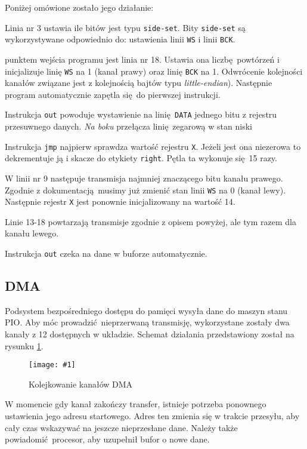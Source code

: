 \documentclass[polish]{aghengthesis}
\let\tempone\itemize
\let\temptwo\enditemize
\renewenvironment{itemize}{\tempone\setlength{\itemsep}{0cm}}{\temptwo}
\newcommand{\imgint}[4]{
	\begin{figure}[{#4}]
		\centering
		\texttt{[image: \#1]}
		\caption{#2}
		\label{#1}
	\end{figure}
}
\newcommand{\imgh}[3]{\imgint{#1}{#2}{#3}{H}}
\begin{document}
			Poniżej omówione zostało jego działanie:
			\begin{itemize}
				\item Linia nr 3 ustawia ile bitów jest typu \lstinline|side-set|. Bity \lstinline|side-set| są wykorzystywane odpowiednio do: ustawienia linii \lstinline|WS| i linii \lstinline|BCK|.
				
				\item punktem wejścia programu jest linia nr 18. Ustawia ona liczbę powtórzeń i inicjalizuje linię \lstinline|WS| na 1 (kanał prawy) oraz linię \lstinline|BCK| na 1. Odwrócenie kolejności kanałów związane jest z kolejnością bajtów typu \textit{little-endian}). Następnie program automatycznie zapętla się do pierwszej instrukcji.
				
				\item Instrukcja \lstinline|out| powoduje wystawienie na linię \lstinline|DATA| jednego bitu z rejestru przesuwnego danych. \textit{Na boku} przełącza linię zegarową w stan niski
				
				\item Instrukcja \lstinline|jmp| najpierw sprawdza wartość rejestru \lstinline|X|. Jeżeli jest ona niezerowa to dekrementuje ją i skacze do etykiety \lstinline|right|. Pętla ta wykonuje się 15 razy.
				
				\item W linii nr 9 następuje transmisja najmniej znaczącego bitu kanału prawego. Zgodnie z dokumentacją musimy już zmienić stan linii \lstinline|WS| na 0 (kanał lewy). Następnie rejestr \lstinline|X| jest ponownie inicjalizowany na wartość 14.
				
				\item Linie 13-18 powtarzają transmisje zgodnie z opisem powyżej, ale tym razem dla kanału lewego.
			\end{itemize}
			
			Instrukcja \lstinline|out| czeka na dane w buforze automatycznie.
		
		\subsection{DMA}
			Podsystem bezpośredniego dostępu do pamięci wysyła dane do maszyn stanu PIO. Aby móc prowadzić nieprzerwaną transmisję, wykorzystane zostały dwa kanały z 12 dostępnych w układzie. Schemat działania przedstawiony został na rysunku \ref{3/dma_chain}.
			\imgh{3/dma_chain}{Kolejkowanie kanałów DMA}{0.55}
			
			W momencie gdy kanał zakończy transfer, istnieje potrzeba ponownego ustawienia jego adresu startowego.
			Adres ten zmienia się w trakcie przesyłu, aby cały czas wskazywać na jeszcze nieprzesłane dane.
			Należy także powiadomić procesor, aby uzupełnił bufor o nowe dane.
			$ $\\
			
\end{document}
